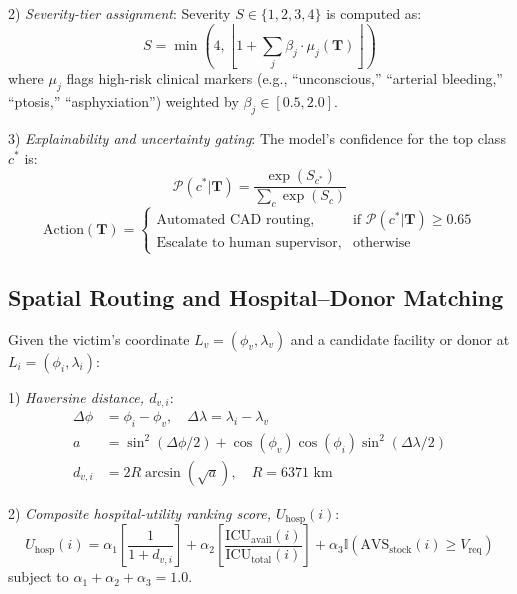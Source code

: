 \documentclass[conference]{IEEEtran}
\begin{document}
2) \textit{Severity-tier assignment}: Severity $S \in \{1, 2, 3, 4\}$ is computed as:
\begin{equation}
S = \min\left(4, \left\lfloor 1 + \sum_j \beta_j \cdot \mu_j(\mathbf{T}) \right\rfloor\right)
\end{equation}
where $\mu_j$ flags high-risk clinical markers (e.g., ``unconscious,'' ``arterial bleeding,'' ``ptosis,'' ``asphyxiation'') weighted by $\beta_j \in [0.5, 2.0]$.

3) \textit{Explainability and uncertainty gating}: The model's confidence for the top class $c^*$ is:
\begin{equation}
\mathcal{P}(c^*|\mathbf{T}) = \frac{\exp(S_{c^*})}{\sum_c \exp(S_c)}
\end{equation}
\begin{equation}
\text{Action}(\mathbf{T}) = 
\begin{cases} 
\text{Automated CAD routing}, & \text{if } \mathcal{P}(c^*|\mathbf{T}) \ge 0.65 \\ 
\text{Escalate to human supervisor}, & \text{otherwise}
\end{cases}
\end{equation}

\subsection{Spatial Routing and Hospital--Donor Matching}
Given the victim's coordinate $L_v = (\phi_v, \lambda_v)$ and a candidate facility or donor at $L_i = (\phi_i, \lambda_i)$:

1) \textit{Haversine distance, $d_{v,i}$}:
\begin{align}
\Delta\phi &= \phi_i - \phi_v, \quad \Delta\lambda = \lambda_i - \lambda_v \\
a &= \sin^2(\Delta\phi/2) + \cos(\phi_v)\cos(\phi_i)\sin^2(\Delta\lambda/2) \\
d_{v,i} &= 2R\arcsin(\sqrt{a}), \quad R = 6371\text{ km}
\end{align}

2) \textit{Composite hospital-utility ranking score, $U_{\text{hosp}}(i)$}:
\begin{equation}
U_{\text{hosp}}(i) = \alpha_1 \left[\frac{1}{1 + d_{v,i}}\right] + \alpha_2 \left[\frac{\text{ICU}_{\text{avail}}(i)}{\text{ICU}_{\text{total}}(i)}\right] + \alpha_3 \mathbb{I}(\text{AVS}_{\text{stock}}(i) \ge V_{\text{req}})
\end{equation}
subject to $\alpha_1 + \alpha_2 + \alpha_3 = 1.0$.
\end{document}
